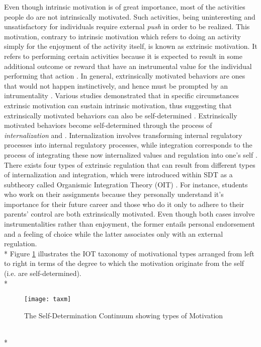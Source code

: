 Even though intrinsic motivation is of great importance, most of the activities people do are not intrinsically motivated. Such activities, being uninteresting and unsatisfactory for individuals  require external \textit{push} in order to be realized. This motivation, contrary to intrinsic motivation which refers to doing an activity simply for the enjoyment of the activity itself, is known as extrinsic motivation. It refers to performing certain activities because it is expected to result in some additional outcome or reward that have an instrumental value for the individual performing that action \cite{ryan2000self}. In general, extrinsically motivated behaviors are ones that would not happen instinctively, and hence must be prompted by an intrumentality \cite{deci1994promoting}. Various studies demonstrated that in specific circumstances extrinsic motivation can sustain intrinsic motivation, thus suggesting that extrinsically motivated behaviors can also be self-determined \cite{deci1994promoting}. Extrinsically motivated behaviors become self-determined through the process of \textit{internalization} and \cite{integration}. Internalization involves transforming internal regulatory processes into internal regulatory processes, while integration corresponds to the process of integrating these now internalized values and regulation into one's self \cite{deci1994promoting}. There exists four types of extrinsic regulation that can result from different types of internalization and integration, which were introduced within SDT as a subtheory called Organismic Integration Theory (OIT) \cite{ryan2000intrinsic, ryan2000self, deci1994promoting}. For instance, students who work on their assignments because they personally understand it's importance for their future career and those who do it only to adhere to their parents' control are both extrinsically motivated. Even though both cases involve instrumentalities rather than enjoyment, the former entails personal endorsement and a feeling of choice while the latter associates only with an external regulation.\\*
Figure \ref{fig:tax} illustrates the IOT taxonomy of motivational types arranged from left to right in terms of the degree to which the motivation originate from the self (i.e. are self-determined).\\*
\begin{figure}[h]
    \centering
    \texttt{[image: taxm]}
    \caption{The Self-Determination Continuum showing types of Motivation}
    \label{fig:tax}
\end{figure}\\*
